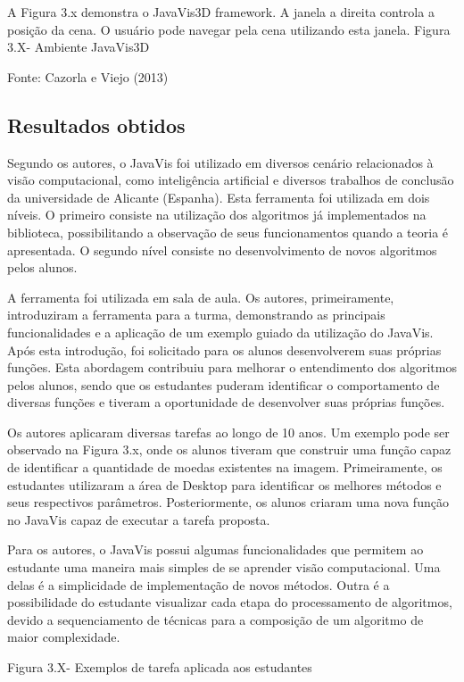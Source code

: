 \documentclass[
	12pt,				%
	oneside,			%
	a4paper,			%
	english,			%
	french,				%
	spanish,			%
	brazil,				%
	]{abntex2}
\begin{document}
A Figura 3.x demonstra o JavaVis3D framework. A janela a direita controla a posição da cena. O usuário pode navegar pela cena utilizando esta janela.
Figura 3.X- Ambiente JavaVis3D

Fonte: Cazorla e Viejo  (2013)

\subsection{Resultados obtidos}

Segundo os autores, o JavaVis foi utilizado em diversos cenário relacionados à visão computacional, como inteligência artificial e diversos trabalhos de conclusão da universidade de Alicante (Espanha). Esta ferramenta foi utilizada em dois níveis. O primeiro consiste na utilização dos algoritmos já implementados na biblioteca, possibilitando a observação de seus funcionamentos quando a teoria é apresentada. O segundo nível consiste no desenvolvimento de novos algoritmos pelos alunos.

A ferramenta foi utilizada em sala de aula. Os autores, primeiramente, introduziram a ferramenta para a turma, demonstrando as principais funcionalidades e a aplicação de um exemplo guiado da utilização do JavaVis. Após esta introdução, foi solicitado para os alunos desenvolverem suas próprias funções. Esta abordagem contribuiu para melhorar o entendimento dos algoritmos pelos alunos, sendo que os estudantes puderam identificar o comportamento de diversas funções e tiveram a oportunidade de desenvolver suas próprias funções.

Os autores aplicaram diversas tarefas ao longo de 10 anos. Um exemplo pode ser observado na Figura 3.x, onde os alunos tiveram que construir uma função capaz de identificar a quantidade de moedas existentes na imagem. Primeiramente, os estudantes utilizaram a área de Desktop para identificar os melhores métodos e seus respectivos parâmetros. Posteriormente, os alunos criaram uma nova função no JavaVis capaz de executar a tarefa proposta.

Para os autores, o JavaVis possui algumas funcionalidades que permitem ao estudante uma maneira mais simples de se aprender visão computacional. Uma delas é a simplicidade de implementação de novos métodos. Outra é a possibilidade do estudante visualizar cada etapa do processamento de algoritmos, devido a sequenciamento de técnicas para a composição de um algoritmo de maior complexidade.

Figura 3.X- Exemplos de tarefa aplicada aos estudantes
\end{document}
